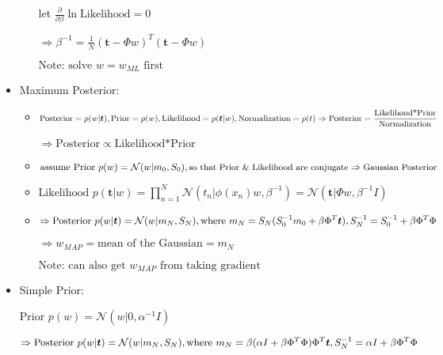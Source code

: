 \begin{itemize}
\begin{itemize}
	let $\frac {\partial} {\partial \beta} \ln \text{Likelihood}=0$ 
	
	$\displaystyle \Rightarrow \beta^{-1}=\frac 1 N (\boldsymbol t-\Phi w)^T(\boldsymbol t-\Phi w)$ 
	
		\(\text{Note: solve $w=w_{ML}$ first}\) 
	\end{itemize}

\item Maximum Posterior:

	\begin{itemize}
	\item $\text{Posterior}=p(w|\boldsymbol t), \text{Prior}=p(w), \text{Likelihood} = p(\boldsymbol t|w), \text{Normalization}=p(t) \\ \displaystyle \Rightarrow \text{Posterior}=\frac {\text{Likelihood*Prior}} {\text{Normalization}}$ 
	
	$\Rightarrow \text{Posterior} \propto \text{Likelihood*Prior} $  
	
	\item $\text{assume Prior } \displaystyle p(w) =  \mathcal{N}(w|m_0,S_0), \\ \small \text{so that Prior \& Likelihood are conjugate} \Rightarrow \text{Gaussian Posterior}$ 
	
	\item $\text{Likelihood } \displaystyle p(\boldsymbol t|w) = \prod_{n=1}^N\mathcal N(t_n|\phi(x_n)w,\beta^{-1}) =\mathcal N(\boldsymbol t|\Phi w,\beta^{-1}I )$ 
	
	\item $\Rightarrow \text{Posterior } \displaystyle p(w|\boldsymbol t) = \mathcal N(w|m_N,S_N),\\ \text{where } m_N=S_N(S_0^{-1}m_0+\beta\Phi^T \boldsymbol t),\space S_N^{-1}=S_0^{-1} + \beta \Phi^T\Phi$ 
	
	$\Rightarrow w_{MAP} = \text{mean of the Gaussian} = m_N$ 
	
		$\text{Note: can also get } w_{MAP} \text{ from taking gradient}$ 
	\end{itemize}

\item Simple Prior:

$\text{Prior } p(w)=\mathcal N(w|0,\alpha^{-1}I)$ 

$\Rightarrow \text{Posterior } \displaystyle p(w|\boldsymbol t) = \mathcal N(w|m_N,S_N),\\ \text{where } \displaystyle m_N=\beta(\alpha I + \beta \Phi^T\Phi)\Phi^T \boldsymbol t,\space S_N^{-1}=\alpha I + \beta \Phi^T\Phi$ 


\end{itemize}
